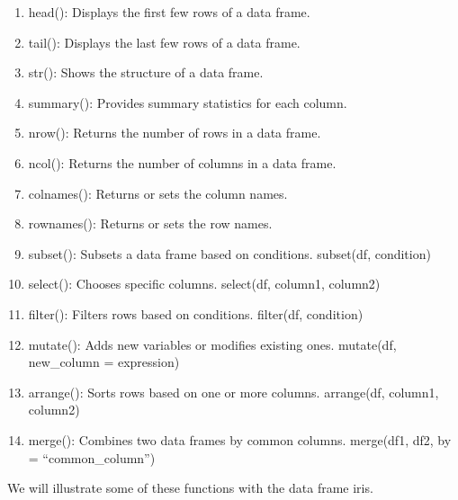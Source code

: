 \documentclass[
]{book}
\newenvironment{Shaded}{\begin{snugshade}}{\end{snugshade}}
\newcommand{\CommentTok}[1]{\textcolor[rgb]{0.56,0.35,0.01}{\textit{#1}}}
\newcommand{\FunctionTok}[1]{\textcolor[rgb]{0.13,0.29,0.53}{\textbf{#1}}}
\newcommand{\NormalTok}[1]{#1}
\providecommand{\tightlist}{%
  \setlength{\itemsep}{0pt}\setlength{\parskip}{0pt}}
\theoremstyle{definition}
\theoremstyle{definition}
\theoremstyle{definition}
\theoremstyle{definition}
\theoremstyle{remark}
\begin{document}
\begin{enumerate}
\def\labelenumi{\arabic{enumi}.}
\tightlist
\item
  head(): Displays the first few rows of a data frame.
\item
  tail(): Displays the last few rows of a data frame.
\item
  str(): Shows the structure of a data frame.
\item
  summary(): Provides summary statistics for each column.
\item
  nrow(): Returns the number of rows in a data frame.
\item
  ncol(): Returns the number of columns in a data frame.
\item
  colnames(): Returns or sets the column names.
\item
  rownames(): Returns or sets the row names.
\item
  subset(): Subsets a data frame based on conditions.
  subset(df, condition)
\item
  select(): Chooses specific columns.
  select(df, column1, column2)
\item
  filter(): Filters rows based on conditions.
  filter(df, condition)
\item
  mutate(): Adds new variables or modifies existing ones.
  mutate(df, new\_column = expression)
\item
  arrange(): Sorts rows based on one or more columns.
  arrange(df, column1, column2)
\item
  merge(): Combines two data frames by common columns.
  merge(df1, df2, by = ``common\_column'')
\end{enumerate}

We will illustrate some of these functions with the data frame iris.

\begin{Shaded}
\end{Shaded}
\end{document}
